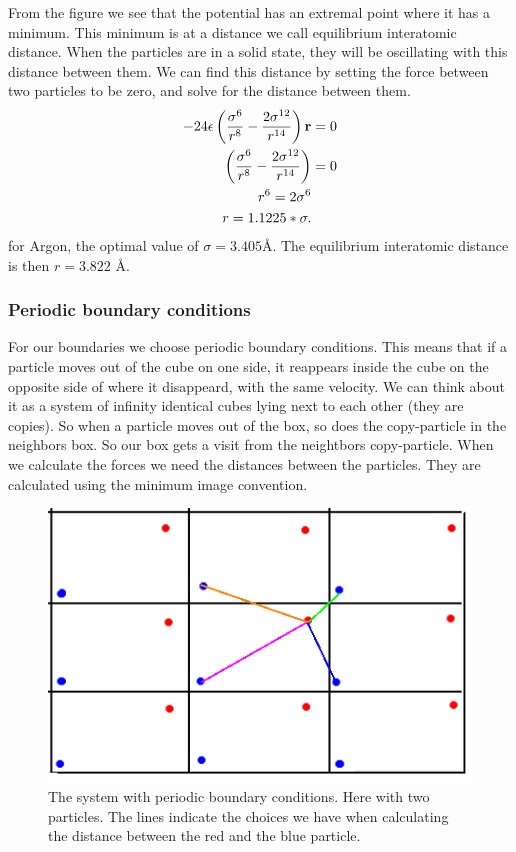 From the figure we see that the potential has an extremal point where it has a minimum. This minimum is at a
distance we call equilibrium interatomic distance. When the particles are in a solid state, they will be oscillating with this distance between them. We can find this distance by setting the force between two particles to be zero, and solve for the distance between them.
\begin{align}
 -24\epsilon \left(\frac{\sigma^6}{r^8} - \frac{2\sigma^{12}}{r^{14}}\right){\bf r} &= 0\\
\left(\frac{\sigma^6}{r^8} - \frac{2\sigma^{12}}{r^{14}}\right) & = 0\\
r^6 = 2 \sigma^6\\
r = 1.1225*\sigma.
\end{align}
for Argon, the optimal value of $\sigma = 3.405$Å. The equilibrium interatomic distance is then $r = 3.822$ Å. 

\subsubsection{Periodic boundary conditions}
For our boundaries we choose periodic boundary conditions. This means that if a particle moves out of the cube on one side, it reappears inside the cube on the opposite side of where it disappeard, with the same velocity. We can think about
it as a system of infinity identical cubes lying next to each other (they are copies). So when a particle moves out of the box, so does the copy-particle in the neighbors box. So our box gets a visit from the neightbors copy-particle.
When we calculate the forces we need the distances between the particles. They are calculated using the minimum image convention. 
\begin{figure}
 \centering
 \includegraphics{./figures/periodic.png}
 \caption{The system with periodic boundary conditions. Here with two particles. The lines indicate the choices we have when calculating the distance between the red and the blue particle.}
 \label{periodic}
\end{figure}

